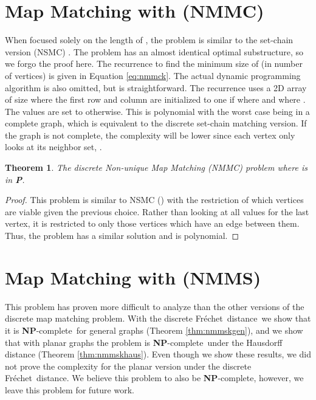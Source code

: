 \documentclass{article}[11pt]
\newcommand{\frechet}{Fr\'echet}
\newcommand{\dfd}{discrete \frechet\ distance}
\newcommand{\npc}{\textbf{NP}-complete}
\newtheorem{theorem}{Theorem}
\begin{document}
\section{Map Matching with  (NMMC)}\label{sec:nmmck}



When focused solely on the length of , the problem is similar to the set-chain
version (NSMC) \cite{Wylie:2014:TCS}.  The problem has an almost identical 
optimal substructure, so we forgo the proof here.  The recurrence to find the minimum
size of  (in number of vertices) is given in Equation \ref{eq:nmmck}. The
actual dynamic programming algorithm is also omitted, but is straightforward.
The recurrence uses a 2D array  of size  where the first row and column are
initialized to one if  where  
and  where . The values are set to  otherwise.
This is polynomial with the worst case being
in a complete graph, which is equivalent to the discrete set-chain matching version.  
If the graph is not complete, the complexity will be lower since each vertex  only looks at 
its neighbor set, .







\begin{theorem}
    The discrete Non-unique Map Matching (NMMC) problem where  is in \textbf{P}.
\end{theorem}

\begin{proof}
    This problem is similar to NSMC (\cite{Wylie:2014:TCS}) with the restriction of 
    which vertices are viable given the previous choice.  
    Rather than looking at all values for the last
    vertex, it is restricted to only those vertices which have an edge
    between them.  Thus, the problem has a similar solution and is polynomial.
    \hfill 
\end{proof}





\section{Map Matching with  (NMMS)} \label{sec:nmmsk}


This problem has proven more difficult to analyze than the other versions
of the discrete map matching problem.  
With the \dfd\ we show that it is \npc\ for general graphs (Theorem \ref{thm:nmmskgen}), 
and we show that with planar graphs the problem is \npc\ under the
Hausdorff distance (Theorem \ref{thm:nmmskhaus}). Even though we show these results,
we did not prove the complexity for the planar version under the \dfd . 
We believe this problem to also be \npc, however, we leave this problem for future work. 
\end{document}
